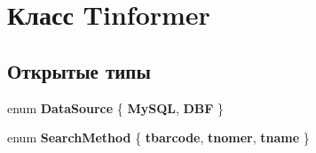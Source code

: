 \hypertarget{class_tinformer}{\section{Класс \-Tinformer}
\label{class_tinformer}
}
\subsection*{Открытые типы}
\begin{DoxyCompactItemize}
\item 
enum {\bfseries \-Data\-Source} \{ {\bfseries \-My\-S\-Q\-L}, 
{\bfseries \-D\-B\-F}
 \}
\item 
enum {\bfseries \-Search\-Method} \{ {\bfseries tbarcode}, 
{\bfseries tnomer}, 
{\bfseries tname}
 \}
\end{DoxyCompactItemize}

